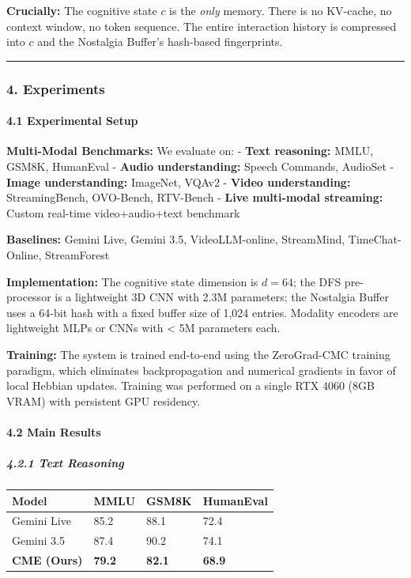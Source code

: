 \documentclass[
  11pt,
  a4paper,
]{article}
\begin{document}
\textbf{Crucially:} The cognitive state \(c\) is the \emph{only} memory.
There is no KV-cache, no context window, no token sequence. The entire
interaction history is compressed into \(c\) and the Nostalgia Buffer's
hash-based fingerprints.

\begin{center}\rule{0.5\linewidth}{0.5pt}\end{center}

\subsubsection{4. Experiments}\label{experiments}

\paragraph{4.1 Experimental Setup}\label{experimental-setup-1}

\textbf{Multi-Modal Benchmarks:} We evaluate on: - \textbf{Text
reasoning:} MMLU, GSM8K, HumanEval - \textbf{Audio understanding:}
Speech Commands, AudioSet - \textbf{Image understanding:} ImageNet,
VQAv2 - \textbf{Video understanding:} StreamingBench, OVO-Bench,
RTV-Bench - \textbf{Live multi-modal streaming:} Custom real-time
video+audio+text benchmark

\textbf{Baselines:} Gemini Live, Gemini 3.5, VideoLLM-online,
StreamMind, TimeChat-Online, StreamForest

\textbf{Implementation:} The cognitive state dimension is \(d = 64\);
the DFS pre-processor is a lightweight 3D CNN with 2.3M parameters; the
Nostalgia Buffer uses a 64-bit hash with a fixed buffer size of 1,024
entries. Modality encoders are lightweight MLPs or CNNs with \textless{}
5M parameters each.

\textbf{Training:} The system is trained end-to-end using the
ZeroGrad-CMC training paradigm, which eliminates backpropagation and
numerical gradients in favor of local Hebbian updates. Training was
performed on a single RTX 4060 (8GB VRAM) with persistent GPU residency.

\paragraph{4.2 Main Results}\label{main-results}

\subparagraph{4.2.1 Text Reasoning}\label{text-reasoning}

\begin{longtable}[]{@{}llll@{}}
\toprule\noalign{}
Model & MMLU & GSM8K & HumanEval \\
\midrule\noalign{}
\endhead
\bottomrule\noalign{}
\endlastfoot
Gemini Live & 85.2 & 88.1 & 72.4 \\
Gemini 3.5 & 87.4 & 90.2 & 74.1 \\
\textbf{CME (Ours)} & \textbf{79.2} & \textbf{82.1} & \textbf{68.9} \\
\end{longtable}
\end{document}
